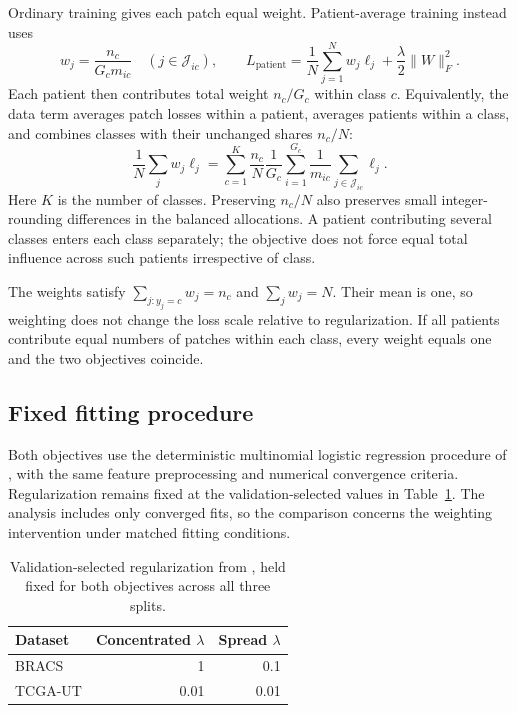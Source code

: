\documentclass[11pt]{article}
\begin{document}
Ordinary training gives each patch equal weight. Patient-average training instead uses
\begin{equation}
 w_j=\frac{n_c}{G_c m_{ic}}\quad(j\in\mathcal J_{ic}),
 \qquad
 L_{\mathrm{patient}}=\frac1N\sum_{j=1}^{N}w_j\ell_j
 +\frac{\lambda}{2}\lVert W\rVert_F^2.
 \label{eq:objective}
\end{equation}
\noindent Each patient then contributes total weight \(n_c/G_c\) within class \(c\). Equivalently, the data term averages patch losses within a patient, averages patients within a class, and combines classes with their unchanged shares \(n_c/N\):
\begin{equation}
 \frac1N\sum_jw_j\ell_j
 =\sum_{c=1}^{K}\frac{n_c}{N}\frac1{G_c}
 \sum_{i=1}^{G_c}\frac1{m_{ic}}\sum_{j\in\mathcal J_{ic}}\ell_j.
 \label{eq:patient-average}
\end{equation}
\noindent Here \(K\) is the number of classes. Preserving \(n_c/N\) also preserves small integer-rounding differences in the balanced allocations. A patient contributing several classes enters each class separately; the objective does not force equal total influence across such patients irrespective of class.

The weights satisfy \(\sum_{j:y_j=c}w_j=n_c\) and \(\sum_jw_j=N\). Their mean is one, so weighting does not change the loss scale relative to regularization. If all patients contribute equal numbers of patches within each class, every weight equals one and the two objectives coincide.

\subsection{Fixed fitting procedure}
Both objectives use the deterministic multinomial logistic regression procedure of \citet{queisler2026patientShortage}, with the same feature preprocessing and numerical convergence criteria. Regularization remains fixed at the validation-selected values in Table~\ref{tab:regularization}. The analysis includes only converged fits, so the comparison concerns the weighting intervention under matched fitting conditions.

\begin{table}[htbp]
\centering
\begin{tabular}{@{}lrr@{}}
\toprule
Dataset & Concentrated \(\lambda\) & Spread \(\lambda\) \\
\midrule
BRACS & 1 & 0.1 \\
TCGA-UT & 0.01 & 0.01 \\
\bottomrule
\end{tabular}
\caption{Validation-selected regularization from \citet{queisler2026patientShortage}, held fixed for both objectives across all three splits.}
\label{tab:regularization}
\end{table}
\end{document}
